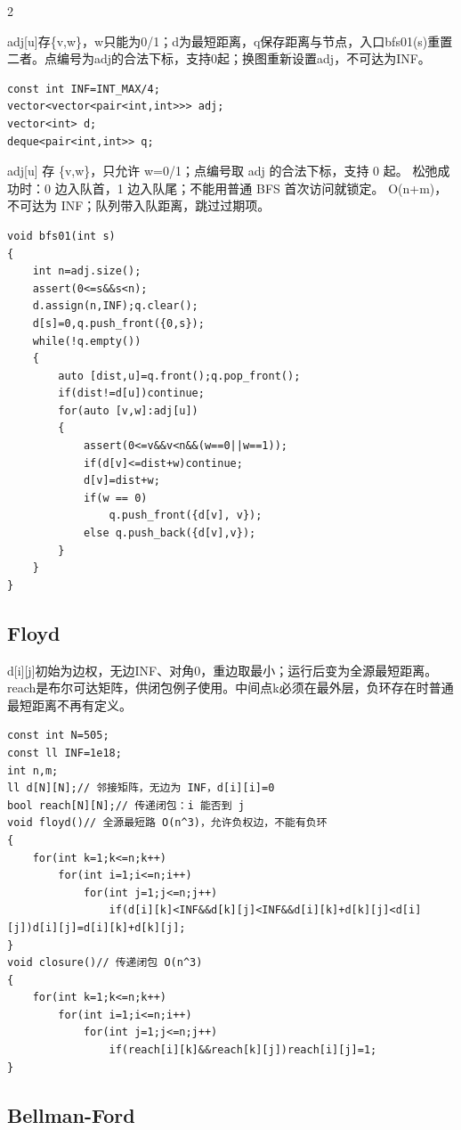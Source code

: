 \documentclass[UTF8,fontset=fandol,a4paper,twoside]{ctexart}
\newcommand{\note}[1]{{\fontsize{10}{12}\selectfont #1\par}}
\begin{document}
\begin{multicols}{2}
\note{adj[\allowbreak{}u]\allowbreak{}存\{v,\allowbreak{}w\}，w只能为0/\allowbreak{}1；d为最短距离，q保存距离与节点，入口bfs01(\allowbreak{}s)\allowbreak{}重置二者。点编号为adj的合法下标，支持0起；换图重新设置adj，不可达为INF。}
\begin{lstlisting}
const int INF=INT_MAX/4;
vector<vector<pair<int,int>>> adj;
vector<int> d;
deque<pair<int,int>> q;
\end{lstlisting}
\note{adj[\allowbreak{}u]\allowbreak{} 存 \{v,\allowbreak{}w\}，只允许 w=\allowbreak{}0/\allowbreak{}1；点编号取 adj 的合法下标，支持 0 起。 松弛成功时：0 边入队首，1 边入队尾；不能用普通 BFS 首次访问就锁定。 O(\allowbreak{}n+\allowbreak{}m)\allowbreak{}，不可达为 INF；队列带入队距离，跳过过期项。}
\begin{lstlisting}
void bfs01(int s)
{
    int n=adj.size();
    assert(0<=s&&s<n);
    d.assign(n,INF);q.clear();
    d[s]=0,q.push_front({0,s});
    while(!q.empty())
    {
        auto [dist,u]=q.front();q.pop_front();
        if(dist!=d[u])continue;
        for(auto [v,w]:adj[u])
        {
            assert(0<=v&&v<n&&(w==0||w==1));
            if(d[v]<=dist+w)continue;
            d[v]=dist+w;
            if(w == 0)
                q.push_front({d[v], v});
            else q.push_back({d[v],v});
        }
    }
}
\end{lstlisting}
\subsection{Floyd}

\note{d[\allowbreak{}i]\allowbreak{}[\allowbreak{}j]\allowbreak{}初始为边权，无边INF、对角0，重边取最小；运行后变为全源最短距离。reach是布尔可达矩阵，供闭包例子使用。中间点k必须在最外层，负环存在时普通最短距离不再有定义。}
\begin{lstlisting}
const int N=505;
const ll INF=1e18;
int n,m;
ll d[N][N];// 邻接矩阵，无边为 INF，d[i][i]=0
bool reach[N][N];// 传递闭包：i 能否到 j
void floyd()// 全源最短路 O(n^3)，允许负权边，不能有负环
{
    for(int k=1;k<=n;k++)
        for(int i=1;i<=n;i++)
            for(int j=1;j<=n;j++)
                if(d[i][k]<INF&&d[k][j]<INF&&d[i][k]+d[k][j]<d[i][j])d[i][j]=d[i][k]+d[k][j];
}
void closure()// 传递闭包 O(n^3)
{
    for(int k=1;k<=n;k++)
        for(int i=1;i<=n;i++)
            for(int j=1;j<=n;j++)
                if(reach[i][k]&&reach[k][j])reach[i][j]=1;
}
\end{lstlisting}
\subsection{Bellman-Ford}


\end{multicols}
\end{document}
